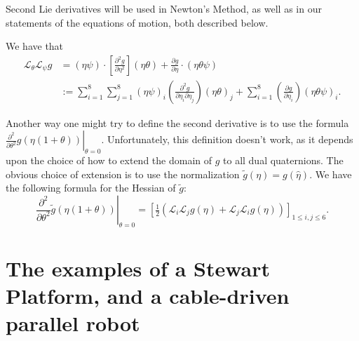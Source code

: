 \documentclass[reqno,12pt]{amsart}
\newcommand{\liederiv}{\mathcal L}
\begin{document}
Second Lie derivatives will be used in Newton's Method, as well as in our statements of the equations of motion, both described below.

We have that
\begin{equation}
\label{second lie deriv}
\begin{aligned}
\liederiv_\theta \liederiv_\psi g &= (\eta \psi) \cdot \left[\frac{\partial^2 g}{\partial \eta^2}\right](\eta \theta) + \frac{\partial g}{\partial \eta} \cdot (\eta \theta \psi) \\
&:= \sum_{i=1}^8 \sum_{j=1}^8 (\eta \psi)_i \left(\frac{\partial^2 g}{\partial \eta_i \partial \eta_j}\right)(\eta \theta)_j + \sum_{i=1}^8 \left(\frac{\partial g}{\partial \eta_i}\right) (\eta \theta \psi)_i .
\end{aligned}
\end{equation}

Another way one might try to define the second derivative is to use the formula $\left.\frac {\partial^2}{\partial\theta^2} g(\eta(1+\theta)) \right | _{\theta=0}$.  Unfortunately, this definition doesn't work, as it depends upon the choice of how to extend the domain of $g$ to all dual quaternions.  The obvious choice of extension is to use the normalization $\tilde g(\eta) = g(\hat\eta)$.  We have the following formula for the Hessian of $\tilde g$:
\begin{equation}
\label{hessian}
\left.\frac{\partial^2}{\partial\theta^2} \tilde g(\eta(1+\theta)) \right|_{\theta = 0} = \left[\tfrac12 (\liederiv_i \liederiv_j g(\eta) + \liederiv_j \liederiv_i g(\eta)) \right]_{1\le i,j\le 6}.
\end{equation}

\section{The examples of a Stewart Platform, and a cable-driven parallel robot}
\label{section examples}
\end{document}
